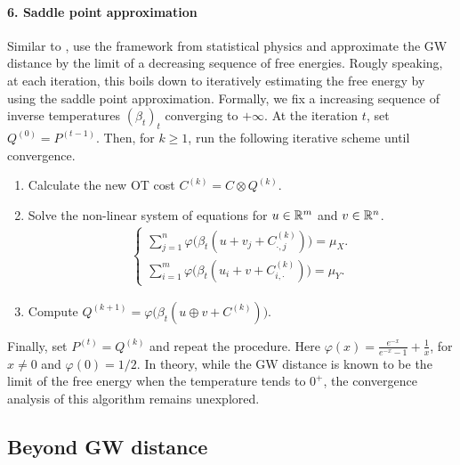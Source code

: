 \paragraph{6. Saddle point approximation} Similar to \citep{Koehl19},
\citet{Koehl23} use the framework from statistical physics and approximate the GW distance by
the limit of a decreasing sequence of free energies. Rougly speaking, at each iteration,
this boils down to iteratively estimating the free energy by using the saddle point approximation.
Formally, we fix a increasing sequence of inverse temperatures $(\beta_t)_t$ converging to $+\infty$.
At the iteration $t$, set $Q^{(0)} = P^{(t-1)}$. Then, for $k \geq 1$,
run the following iterative scheme until convergence.
\begin{enumerate}
  \item Calculate the new OT cost $C^{(k)} = C \otimes Q^{(k)}$.
  \item Solve the non-linear system of equations for $u \in \mathbb R^m$ and $v \in \mathbb R^n$.
  \begin{align}
    \begin{cases}
      \sum\limits_{j=1}^n \varphi \big( \beta_t (u + v_j + C^{(k)}_{\cdot, j}) \big) = \mu_X. \\
      \sum\limits_{i=1}^m \varphi \big( \beta_t (u_i + v + C^{(k)}_{i, \cdot}) \big) = \mu_Y.
    \end{cases}
  \end{align}
  \item Compute $Q^{(k+1)} = \varphi \big( \beta_t (u \oplus v + C^{(k)}) \big)$.
\end{enumerate}
Finally, set $P^{(t)} = Q^{(k)}$ and repeat the procedure.
Here $\varphi(x) = \frac{e^{-x}}{e^{-x} - 1} + \frac{1}{x}$, for $x \neq 0$ and $\varphi(0) = 1/2$.
In theory, while the GW distance is known to be the limit of the free energy when
the temperature tends to $0^+$, the convergence analysis of this algorithm remains unexplored.

\subsection{Beyond GW distance}
\label{subsec:beyond_gw}

